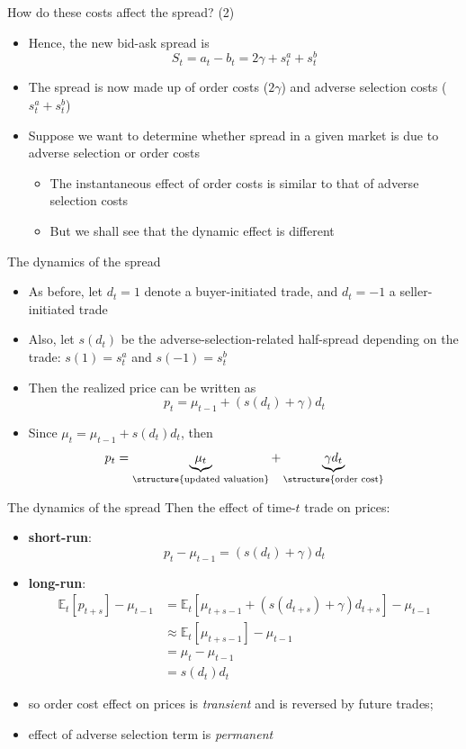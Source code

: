 \documentclass[english,10pt
,aspectratio=169
]{beamer}
\begin{document}
\begin{frame}{How do these costs affect the spread? (2)}
	\begin{itemize}
		\item  Hence, the new bid-ask spread is 
		\[
		S_{t} = a_{t} - b_{t} = 2\gamma +s^{a}_{t}  + s^{b}_{t}
		\]
		\item The spread is now made up of order costs ($2\gamma$) and adverse selection costs ($s^{a}_{t}  + s^{b}_{t}$)
		\item Suppose we want to determine whether spread in a given market is due to adverse selection or order costs
		\begin{itemize}
			\item The instantaneous effect of order costs is similar to that of adverse selection costs
			\item But we shall see that the dynamic effect is different
		\end{itemize}
	\end{itemize}
\end{frame}


\begin{frame}{The dynamics of the spread}
	\begin{itemize}
		\item As before, let $d_{t}=1$ denote a buyer-initiated trade, and $d_{t} = -1$ a seller-initiated trade
		\item Also, let $s(d_{t})$ be the adverse-selection-related half-spread depending on the trade: $s(1)=s^{a}_{t}$ and $s(-1)=s^{b}_{t}$
		\item Then the realized price can be written as
		\[
		p_{t} = \mu_{t-1} + (s(d_{t}) + \gamma) d_{t}
		\]
		\item Since $\mu_{t} = \mu_{t-1} + s(d_{t}) d_{t}$, then
		\[
		p_{t}  = \underbrace{\mu_{t}}_{\structure{\text{updated valuation}}} + \underbrace{\gamma d_{t}}_{\structure{\text{order cost}}}
		\]
	\end{itemize}
\end{frame}


\begin{frame}{The dynamics of the spread}
	Then the effect of time-$t$ trade on prices:
	\begin{itemize}
		\item \textbf{short-run}: $$p_t - \mu_{t-1} = (s(d_{t}) + \gamma) d_{t}$$
		\item \textbf{long-run}:
		\begin{align*}
			\mathbb{E}_t [p_{t+s}] - \mu_{t-1} &= \mathbb{E}_t [\mu_{t+s-1} + (s(d_{t+s}) + \gamma) d_{t+s}] - \mu_{t-1}
			\\
			&\approx \mathbb{E}_t [\mu_{t+s-1}] - \mu_{t-1}
			\\
			&= \mu_t - \mu_{t-1}
			\\
			&= s(d_t) d_t
		\end{align*}
		\item so order cost effect on prices is \emph{transient} and is reversed by future trades;
		\item effect of adverse selection term is \emph{permanent}
	\end{itemize}
\end{frame}
\end{document}

